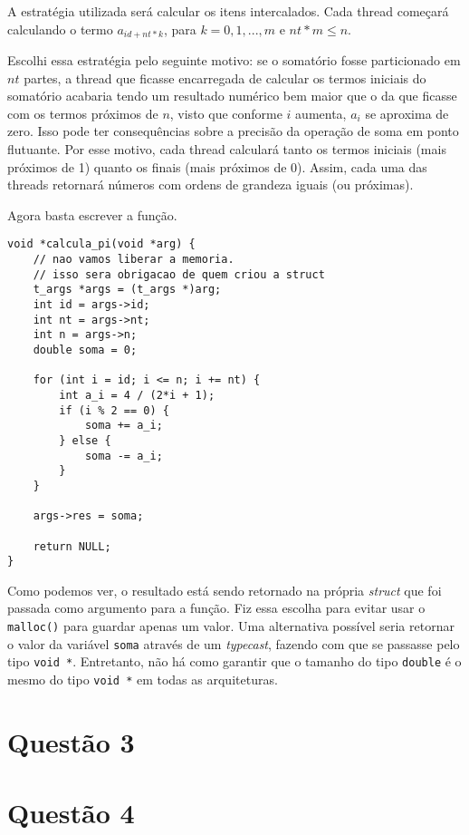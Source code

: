 \documentclass{article}
\begin{document}
A estratégia utilizada será calcular os itens intercalados. Cada thread começará calculando o termo
$a_{id+nt*k}$, para $k=0,1,...,m$ e $nt*m \le n$.

Escolhi essa estratégia pelo seguinte motivo: se o somatório fosse particionado em $nt$ partes,
a thread que ficasse encarregada de calcular os termos iniciais do somatório acabaria tendo um
resultado numérico bem maior que o da que ficasse com os termos próximos de $n$, visto que conforme
$i$ aumenta, $a_i$ se aproxima de zero. Isso pode ter consequências sobre a precisão da
operação de soma em ponto flutuante. Por esse motivo, cada thread calculará tanto os termos iniciais
(mais próximos de 1) quanto os finais (mais próximos de 0). Assim, cada uma das threads retornará números
com ordens de grandeza iguais (ou próximas).

Agora basta escrever a função.

\begin{verbatim}
void *calcula_pi(void *arg) {
	// nao vamos liberar a memoria.
	// isso sera obrigacao de quem criou a struct
	t_args *args = (t_args *)arg;
	int id = args->id;
	int nt = args->nt;
	int n = args->n;
	double soma = 0;

	for (int i = id; i <= n; i += nt) {
		int a_i = 4 / (2*i + 1);
		if (i % 2 == 0) {
			soma += a_i;
		} else {
			soma -= a_i;
		}
	}

	args->res = soma;

	return NULL;
}
\end{verbatim}

Como podemos ver, o resultado está sendo retornado na própria \emph{struct} que foi passada como
argumento para a função. Fiz essa escolha para evitar usar o \texttt{malloc()} para guardar apenas
um valor. Uma alternativa possível seria retornar o valor da variável \texttt{soma} através de um
\emph{typecast}, fazendo com que se passasse pelo tipo \texttt{void *}. Entretanto, não há como garantir
que o tamanho do tipo \texttt{double} é o mesmo do tipo \texttt{void *} em todas as arquiteturas.

\section*{Questão 3}



\section*{Questão 4}
\end{document}
